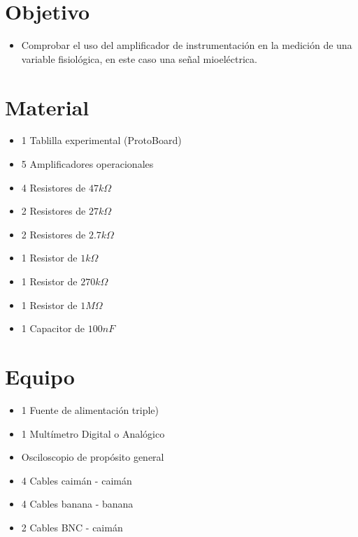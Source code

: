 \documentclass[12pt]{article}
\begin{document}
	\tableofcontents
	\newpage
	
	\section{Objetivo}
	\begin{itemize}
	    \item[\checkmark] Comprobar el uso del amplificador de instrumentación en la medición de una variable fisiológica, en este caso una señal mioeléctrica.
	\end{itemize}
	
	\begin{multicols}{2}
	\section{Material}
	\begin{itemize}
	    \item 1 Tablilla experimental (ProtoBoard)
	    \item 5 Amplificadores operacionales
	    \item 4 Resistores de $47 k\Omega$
	    \item 2 Resistores de $27 k\Omega$
	    \item 2 Resistores de $2.7 k\Omega$
	    \item 1 Resistor de $1 k\Omega$
	    \item 1 Resistor de $270 k\Omega$
	    \item 1 Resistor de $1 M\Omega$
	    \item 1 Capacitor de $100 nF$
	\end{itemize}
	
	\columnbreak
	\section{Equipo}
	\begin{itemize}
	    \item 1 Fuente de alimentación triple)
	    \item 1 Multímetro Digital o Analógico
	    \item Osciloscopio de propósito general
	    \item 4 Cables caimán - caimán
	    \item 4 Cables banana - banana
	    \item 2 Cables BNC - caimán
	    \end{itemize}
	    \end{multicols}
	
\end{document}
